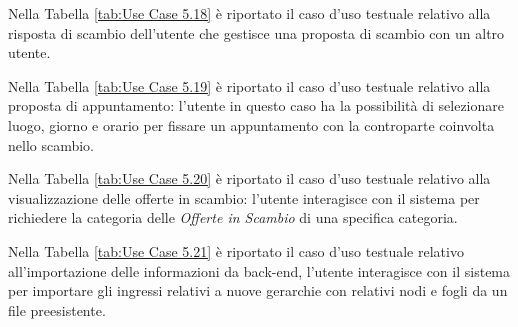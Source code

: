 Nella Tabella \ref{tab:Use Case 5.18} è riportato il caso d'uso testuale relativo alla risposta di scambio dell'utente che gestisce una proposta di scambio con un altro utente.\bigskip

Nella Tabella \ref{tab:Use Case 5.19} è riportato il caso d'uso testuale relativo alla proposta di appuntamento: l'utente in questo caso ha la possibilità di selezionare luogo, giorno e orario per fissare un appuntamento con la controparte coinvolta nello scambio.\bigskip 

Nella Tabella \ref{tab:Use Case 5.20} è riportato il caso d'uso testuale relativo alla visualizzazione delle offerte in scambio: l'utente interagisce con il sistema per richiedere la categoria delle \textit{Offerte in Scambio} di una specifica categoria.\bigskip

Nella Tabella \ref{tab:Use Case 5.21} è riportato il caso d'uso testuale relativo all'importazione delle informazioni da back-end, l'utente interagisce con il sistema per importare gli ingressi relativi a nuove gerarchie con relativi nodi e fogli da un file preesistente.\bigskip
